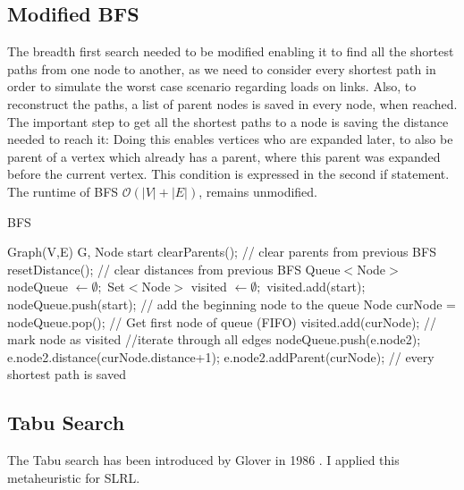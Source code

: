\documentclass [12pt]{article}
\begin{document}
\subsection{Modified BFS}
The breadth first search needed to be modified enabling it to find all the shortest paths 
from one node to another, as we need to consider every shortest path in order to simulate
the worst case scenario regarding loads on links. Also, to reconstruct the paths, a list of parent nodes is saved
in every node, when reached. The important step to get all the shortest paths to a node is saving the distance needed to reach it:
Doing this enables vertices who are expanded later, to also be parent of a vertex which already has a parent, where this parent was
expanded before the current vertex. This condition is expressed in the second if statement.
The runtime of BFS $\mathcal O(|V| + |E|)$, remains unmodified. 
\begin{algorithm}[H]
  \caption{BFS}
  \label{BFS}
  \begin{algorithmic}[2]
    \Require Graph(V,E) G, Node start
    \State clearParents();    // clear parents from previous BFS
    \State resetDistance();   // clear distances from previous BFS
    \State Queue$<$Node$>$ nodeQueue $\gets \emptyset;$
    \State Set$<$Node$>$ visited $\gets \emptyset;$
    \State visited.add(start);
    \State nodeQueue.push(start); // add the beginning node to the queue 
    \State Node curNode = nodeQueue.pop(); // Get first node of queue (FIFO)
    \State visited.add(curNode); // mark node as visited
     //iterate through all edges  
    \State nodeQueue.push(e.node2);
    \State e.node2.distance(curNode.distance+1);
    \EndIf
    \State e.node2.addParent(curNode); // every shortest path is saved 
    \EndIf
    \EndFor
    \EndWhile
  \end{algorithmic}
\end{algorithm}

\subsection{Tabu Search}
The Tabu search has been introduced by Glover in 1986 \cite{Glover:1986:FPI:15310.15311}. I applied this metaheuristic for SLRL.
\end{document}
